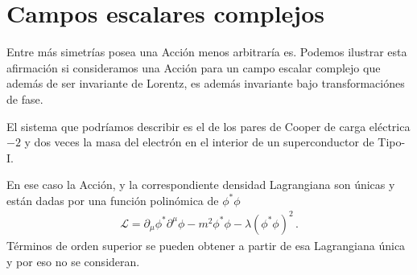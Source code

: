 \section{Campos escalares complejos}
Entre más simetrías posea una Acción menos arbitraría es. Podemos
ilustrar esta afirmación si consideramos una Acción para un campo escalar
complejo que además de ser invariante de Lorentz, es además invariante
bajo transformaciónes de fase.

El sistema que podríamos describir es el de los pares de Cooper de carga eléctrica $-2$ y dos veces la masa del electrón en el interior de un superconductor de Tipo-I.



\begin{frame}


En ese caso la Acción, y la correspondiente densidad Lagrangiana son
únicas y están dadas por una función polinómica de $\phi^{*}\phi$
\begin{align}
  \label{eq:41qftnew}
  \mathcal{L}=\partial_{\mu}\phi^{*} \partial^{\mu}\phi-m^2\phi^{*}\phi-\lambda \left(\phi^{*}\phi \right)^2\,.
\end{align}
Términos de orden superior se pueden obtener a partir de esa
Lagrangiana única y por eso no se consideran. 
\end{frame}

